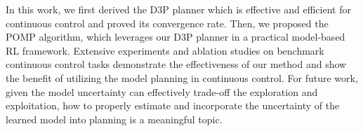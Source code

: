 \documentclass{article} %
\begin{document}
In this work, we first derived the D3P planner which is effective and efficient for continuous control  and proved its convergence rate. Then, we proposed the POMP algorithm, which leverages our D3P planner in a practical model-based RL framework. Extensive experiments and ablation studies on benchmark continuous control
tasks demonstrate the effectiveness of our method and show the benefit of utilizing the model planning in continuous control.
For future work,  given the model uncertainty can effectively trade-off the exploration and  exploitation, how to properly estimate and  incorporate the uncertainty of the learned model into planning is a meaningful topic.
\end{document}
